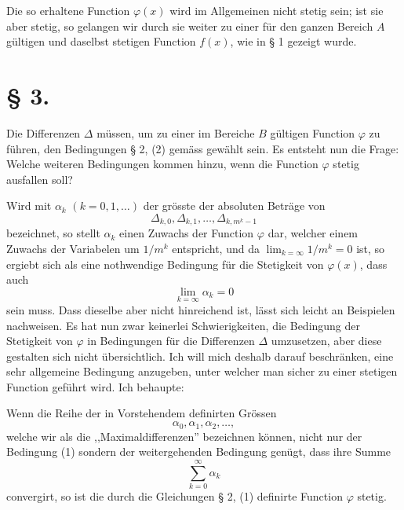 Die so erhaltene Function $\varphi(x)$ wird im Allgemeinen nicht stetig sein; ist sie aber stetig, so gelangen wir durch sie weiter zu einer für den ganzen Bereich $A$ gültigen und daselbst stetigen Function $f(x)$, wie in § 1 gezeigt wurde.

\section*{§ 3.}

Die Differenzen $\Delta$ müssen, um zu einer im Bereiche $B$ gültigen Function $\varphi$ zu führen, den Bedingungen § 2, (2) gemäss gewählt sein. Es entsteht nun die Frage: Welche weiteren Bedingungen kommen hinzu, wenn die Function $\varphi$ stetig ausfallen soll?

Wird mit $\alpha_k$ $(k=0,1,\ldots)$ der grösste der absoluten Beträge von
\[
 \Delta_{k,0},\Delta_{k,1},\ldots,\Delta_{k,m^k-1}
\]
bezeichnet, so stellt $\alpha_k$ einen Zuwachs der Function $\varphi$ dar, welcher einem Zuwachs der Variabelen um $1/m^k$ entspricht, und da $\lim_{k=\infty}1/m^k=0$ ist, so ergiebt sich als eine nothwendige Bedingung für die Stetigkeit von $\varphi(x)$, dass auch
\begin{equation}
 \lim_{k=\infty}\alpha_k=0
\tag{1}
\end{equation}
sein muss. Dass dieselbe aber nicht hinreichend ist, lässt sich leicht an Beispielen nachweisen. Es hat nun zwar keinerlei Schwierigkeiten, die Bedingung der Stetigkeit von $\varphi$ in Bedingungen für die Differenzen $\Delta$ umzusetzen, aber diese gestalten sich nicht übersichtlich. Ich will mich deshalb darauf beschränken, eine sehr allgemeine Bedingung anzugeben, unter welcher man sicher zu einer stetigen Function geführt wird. Ich behaupte:

Wenn die Reihe der in Vorstehendem definirten Grössen
\[
 \alpha_0,\alpha_1,\alpha_2,\ldots,
\]
welche wir als die ,,Maximaldifferenzen'' bezeichnen können, nicht nur der Bedingung (1) sondern der weitergehenden Bedingung genügt, dass ihre Summe
\begin{equation}
 \sum_{k=0}^{\infty}\alpha_k
\tag{2}
\end{equation}
convergirt, so ist die durch die Gleichungen § 2, (1) definirte Function $\varphi$ stetig.

